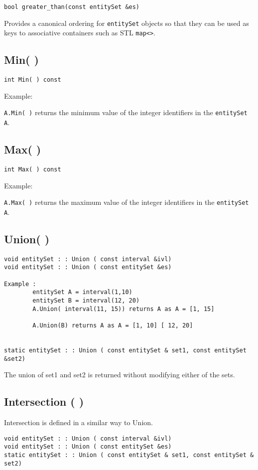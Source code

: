 \documentclass[letterpaper,12pt]{article}
\begin{document}
\begin{verbatim}
bool greater_than(const entitySet &es)
\end{verbatim}

Provides a canonical ordering for {\tt entitySet} objects so that they can be 
used as keys to associative containers such as STL {\tt map<>}.

\subsection{Min( )}
\begin{verbatim}
int Min( ) const
\end{verbatim}
Example:

{\tt A.Min( )} returns the minimum value of the integer identifiers in the 
{\tt  entitySet A}. 

\subsection{Max( )}
\begin{verbatim}
int Max( ) const 
\end{verbatim}
Example:

{\tt A.Max( )} returns the maximum value of the integer identifiers in the 
{\tt entitySet A}.

\subsection{Union( )}
\begin{verbatim}
void entitySet : : Union ( const interval &ivl)
void entitySet : : Union ( const entitySet &es)

Example :  
        entitySet A = interval(1,10)
        entitySet B = interval(12, 20)
        A.Union( interval(11, 15)) returns A as A = [1, 15]

        A.Union(B) returns A as A = [1, 10] [ 12, 20]


static entitySet : : Union ( const entitySet & set1, const entitySet &set2)
\end{verbatim}

The union of set1 and set2 is returned without modifying either of the sets.

\subsection{Intersection ( )}
Intersection is defined in a similar way to Union. 
\begin{verbatim}
void entitySet : : Union ( const interval &ivl)
void entitySet : : Union ( const entitySet &es)
static entitySet : : Union ( const entitySet & set1, const entitySet & set2)
\end{verbatim}
\end{document}
